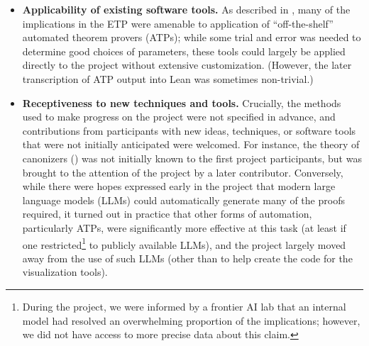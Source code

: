 \begin{itemize}
\item \textbf{Applicability of existing software tools.}  As described in , many of the implications in the ETP were amenable to application of ``off-the-shelf'' automated theorem provers (ATPs); while some trial and error was needed to determine good choices of parameters, these tools could largely be applied directly to the project without extensive customization.  (However, the later transcription of ATP output into Lean was sometimes non-trivial.)
\item \textbf{Receptiveness to new techniques and tools.}  Crucially, the methods used to make progress on the project were not specified in advance, and contributions from participants with new ideas, techniques, or software tools that were not initially anticipated were welcomed.  For instance, the theory of canonizers () was not initially known to the first project participants, but was brought to the attention of the project by a later contributor.  Conversely, while there were hopes expressed early in the project that modern large language models (LLMs) could automatically generate many of the proofs required, it turned out in practice that other forms of automation, particularly ATPs, were significantly more effective at this task (at least if one restricted\footnote{During the project, we were informed by a frontier AI lab that an internal model had resolved an overwhelming proportion of the implications; however, we did not have access to more precise data about this claim.} to publicly available LLMs), and the project largely moved away from the use of such LLMs (other than to help create the code for the visualization tools).
\end{itemize}

